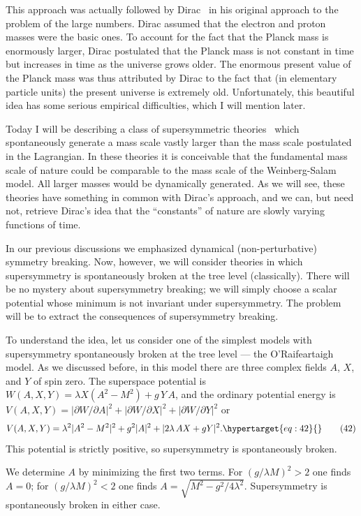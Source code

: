 \documentclass[11pt,a4paper]{article}
\newcommand{\eqtarget}[1]{\hypertarget{eq:#1}{\mathstrut}\tag{#1}}
\begin{document}
This approach was actually followed by Dirac~\cite{ref7} in his original
approach to the problem of the large numbers. Dirac assumed that
the electron and proton masses were the basic ones. To account for
the fact that the Planck mass is enormously larger, Dirac postulated
that the Planck mass is not constant in time but increases in time as
the universe grows older. The enormous present value of the Planck
mass was thus attributed by Dirac to the fact that (in elementary
particle units) the present universe is extremely old. Unfortunately,
this beautiful idea has some serious empirical difficulties,
which I will mention later.

Today I will be describing a class of supersymmetric theories~\cite{ref14}
which spontaneously generate a mass scale vastly larger than the
mass scale postulated in the Lagrangian. In these theories it is
conceivable that the fundamental mass scale of nature could be comparable
to the mass scale of the Weinberg-Salam model. All larger
masses would be dynamically generated. As we will see, these
theories have something in common with Dirac's approach, and we can,
but need not, retrieve Dirac's idea that the ``constants'' of nature
are slowly varying functions of time.

In our previous discussions we emphasized dynamical (non-perturbative)
symmetry breaking. Now, however, we will consider theories in which
supersymmetry is spontaneously broken at the tree
level (classically). There will be no mystery about supersymmetry
breaking; we will simply choose a scalar potential whose minimum is
not invariant under supersymmetry. The problem will be to extract
the consequences of supersymmetry breaking.

To understand the idea, let us consider one of the simplest
models with supersymmetry spontaneously broken at the tree level ---
the O'Raifeartaigh model. As we discussed before, in this model
there are three complex fields $A$, $X$, and $Y$ of spin zero. The superspace
potential is $W(A,X,Y) = \lambda X(A^2 - M^2) + g\, Y\, A$, and the ordinary
potential energy is $V(A,X,Y) = |\partial W/\partial A|^2 + |\partial W/\partial X|^2 + |\partial W/\partial Y|^2$ or
\begin{equation}
V(A,X,Y) = \lambda^2 |A^2 - M^2|^2 + g^2 |A|^2 + |2 \lambda\, A X + gY|^2 .
\eqtarget{42}
\end{equation}
This potential is strictly positive, so supersymmetry is spontaneously
broken.

We determine $A$ by minimizing the first two terms. For $(g/\lambda M)^2 > 2$
one finds $A = 0$; for $(g/\lambda M)^2 < 2$ one finds $A = \sqrt{M^2 - g^2/4\lambda^2}$. Supersymmetry
is spontaneously broken in either case.
\end{document}
